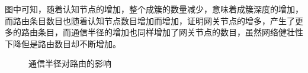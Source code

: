 \documentclass[a4paper,AutoFakeBold,oneside,12pt]{book}
\begin{document}
  图中可知，随着认知节点的增加，整个成簇的数量减少，意味着成簇深度的增加，而路由条目数目也随着认知节点数目增加而增加，证明网关节点的增多，产生了更多的路由条目，而通信半径的增加也同样增加了网关节点的数目，虽然网络健壮性下降但是路由数目却不断增加。
\begin{figure}[htbp]
\centering  
  \caption{通信半径对路由的影响}  
  \label{fig:2}               
   \end{figure}
   
\end{document}
